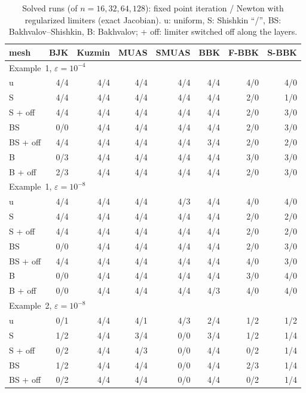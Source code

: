 \begin{table}[!htbp]
\centering\scriptsize\setlength{\tabcolsep}{3pt}
\caption{Solved runs (of $n=16,32,64,128$): fixed point iteration / Newton with regularized limiters (exact Jacobian). u: uniform, S: Shishkin ``/'', BS: Bakhvalov--Shishkin, B: Bakhvalov; + off: limiter switched off along the layers.}\label{tab:nall}
\begin{tabular}{l rrrrrrr}
\toprule
mesh & BJK & Kuzmin & MUAS & SMUAS & BBK & F-BBK & S-BBK\\
\midrule
\multicolumn{8}{l}{Example~1, $\varepsilon=10^{-4}$}\\
u & 4/4 & 4/4 & 4/4 & 4/4 & 4/4 & 4/0 & 4/0 \\
S & 4/4 & 4/4 & 4/4 & 4/4 & 4/4 & 2/0 & 1/0 \\
S + off & 4/4 & 4/4 & 4/4 & 4/4 & 4/4 & 2/0 & 3/0 \\
BS & 0/0 & 4/4 & 4/4 & 4/4 & 4/4 & 2/0 & 3/0 \\
BS + off & 4/4 & 4/4 & 4/4 & 4/4 & 3/4 & 2/0 & 2/0 \\
B & 0/3 & 4/4 & 4/4 & 4/4 & 4/4 & 3/0 & 3/0 \\
B + off & 2/3 & 4/4 & 4/4 & 4/4 & 4/4 & 2/0 & 3/0 \\
\midrule
\multicolumn{8}{l}{Example~1, $\varepsilon=10^{-8}$}\\
u & 4/4 & 4/4 & 4/4 & 4/3 & 4/4 & 4/0 & 4/0 \\
S & 4/4 & 4/4 & 4/4 & 4/4 & 4/4 & 2/0 & 2/0 \\
S + off & 4/4 & 4/4 & 4/4 & 4/4 & 4/4 & 2/0 & 2/0 \\
BS & 0/0 & 4/4 & 4/4 & 4/4 & 4/4 & 2/0 & 3/0 \\
BS + off & 4/4 & 4/4 & 4/4 & 4/4 & 4/4 & 4/0 & 3/0 \\
B & 0/0 & 4/4 & 4/4 & 4/4 & 4/4 & 3/0 & 4/0 \\
B + off & 0/0 & 4/4 & 4/4 & 4/4 & 4/3 & 4/0 & 4/0 \\
\midrule
\multicolumn{8}{l}{Example~2, $\varepsilon=10^{-8}$}\\
u & 0/1 & 4/4 & 4/1 & 4/3 & 2/4 & 1/2 & 1/2 \\
S & 1/2 & 4/4 & 3/4 & 0/0 & 3/4 & 1/2 & 1/4 \\
S + off & 0/2 & 4/4 & 4/3 & 0/0 & 4/4 & 0/2 & 1/4 \\
BS & 1/2 & 4/4 & 4/4 & 0/0 & 4/4 & 2/3 & 1/4 \\
BS + off & 0/2 & 4/4 & 4/4 & 0/0 & 4/4 & 0/2 & 1/4 \\

\end{tabular}
\end{table}
